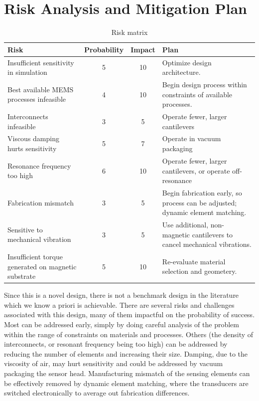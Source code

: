 \section{Risk Analysis and Mitigation Plan}

\begin{table}[h!]
\centering
\begin{tabularx}{.85\textwidth}{|X||c|c|X|}
    \hline
    Risk & Probability & Impact & Plan\\
    \hline
    \hline
    Insufficient sensitivity in simulation & 5 & 10 & Optimize design architecture. \\
    \hline
    Best available MEMS processes infeasible & 4 & 10 & Begin design process within constraints of available processes. \\
    \hline
    Interconnects infeasible & 3 & 5 & Operate fewer, larger cantilevers \\
    \hline
    Viscous damping hurts sensitivity & 5 & 7 & Operate in vacuum packaging \\
    \hline
    Resonance frequency too high & 6  & 10 & Operate fewer, larger cantilevers, or operate off-resonance \\
    \hline
    Fabrication mismatch & 3 & 5 & Begin fabrication early, so process can be adjusted; dynamic element matching. \\
    \hline
    Sensitive to mechanical vibration & 3 & 5 & Use additional, non-magnetic cantilevers to cancel mechanical vibrations. \\
    \hline
    Insufficient torque generated on magnetic substrate & 5 & 10 & Re-evaluate material selection and geometery. \\
    \hline
\end{tabularx}
\caption{Risk matrix}
\label{table:risk}
\end{table}

Since this is a novel design, there is not a benchmark design in the literature which we know a priori is achievable. There are several risks and challenges associated with this design, many of them impactful on the probability of success. Most can be addressed early, simply by doing careful analysis of the problem within the range of constraints on materials and processes. Others (the density of interconnects, or resonant frequency being too high) can be addressed by reducing the number of elements and increasing their size. Damping, due to the viscosity of air, may hurt sensitivity and could be addressed by vacuum packaging the sensor head. Manufacturing mismatch of the sensing elements can be effectively removed by dynamic element matching, where the transducers are switched electronically to average out fabrication differences.

